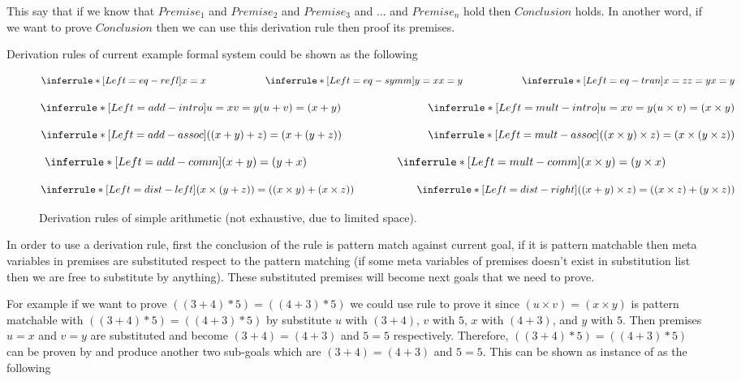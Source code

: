 \documentclass[master.tex]{subfiles}
\begin{document}
This say that if we know that $Premise_1$ and $Premise_2$ and $Premise_3$ and
$\ldots$ and $Premise_n$ hold then $Conclusion$ holds. In another word, if
we want to prove $Conclusion$ then we can use this derivation rule then proof
its premises.

Derivation rules of current example formal system could be shown as the
following

\begin{figure}[H]
\centering
$$
\derivRule{eq-refl}{x = x}{ } \qquad  \qquad  \qquad
\derivRule{eq-symm}{x = y}{y = x} \qquad  \qquad  \qquad
\derivRule{eq-tran}{x = y}{x = z \\ z = y}
$$

$$
\derivRule{add-intro}{(u + v) = (x + y)}{u = x \\ v = y} \qquad  \qquad \qquad \qquad
\derivRule{mult-intro}{(u \times v) = (x \times y)}{u = x \\ v = y}
$$

$$
\derivRule{add-assoc}{((x + y) + z) = (x + (y + z))}{ } \qquad  \qquad  \qquad \qquad
\derivRule{mult-assoc}{((x \times y) \times z) = (x \times (y \times z))}{ }
$$

$$
\derivRule{add-comm}{(x + y) = (y + x)}{ } \qquad  \qquad  \qquad \qquad
\derivRule{mult-comm}{(x \times y) = (y \times x)}{  }
$$

$$
\derivRule{dist-left} {(x \times (y + z)) = ((x \times y) + (x
  \times z))}{ } \qquad \qquad  \qquad
\derivRule{dist-right}{((x + y) \times z) = ((x \times z) + (y
  \times z))}{ }
$$
\caption{Derivation rules of simple arithmetic (not exhaustive, due to limited
  space).}
\label{fig:background-derivation-rules}
\end{figure}

In order to use a derivation rule, first the conclusion of the rule is pattern
match against current goal, if it is pattern matchable then meta variables in
premises are substituted respect to the pattern matching (if some meta variables
of premises doesn't exist in substitution list then we are free to substitute by
anything). These substituted premises will become next goals that we need to prove.

For example if we want to prove $((3 + 4) * 5) = ((4 + 3) * 5)$ we could use
rule  to prove it since $(u \times v) = (x \times y)$ is
pattern matchable with $((3 + 4) * 5) = ((4 + 3) * 5)$ by substitute $u$ with $(3 +
4)$, $v$ with $5$, $x$ with $(4 + 3)$, and $y$ with $5$. Then premises $u = x$
and $v = y$ are substituted and become $(3 + 4) = (4 + 3)$ and $5 = 5$
respectively. Therefore, $((3 + 4) * 5) = ((4 + 3) * 5)$ can be proven by
 and produce another two sub-goals which are $(3 + 4) =
(4 + 3)$ and $5 = 5$. This can be shown as instance of 
as the following
\end{document}
